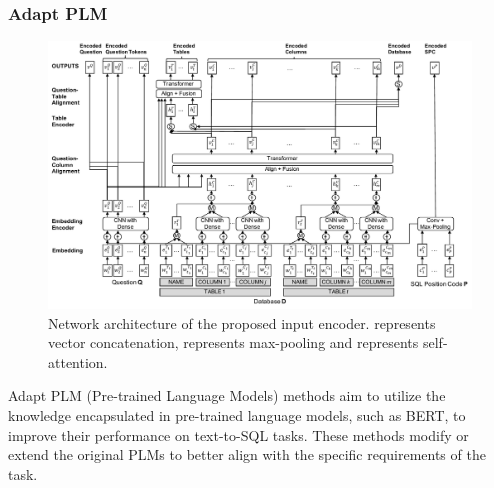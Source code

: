 \subsubsection{Adapt PLM} %
\label{sec:adaptplm}

\begin{figure}[htbp]
    \centering
    \includegraphics[width=\textwidth]{pics/enc/fig_encode}
    \caption{Network architecture of the proposed input encoder.  represents vector concatenation,  represents max-pooling and  represents self-attention.\cite{choi_ryansql_2020}}
    \label{fig:ryan}
\end{figure}

Adapt PLM (Pre-trained Language Models) methods aim to utilize the knowledge encapsulated in pre-trained language models, such as BERT\cite{DBLP:journals/corr/abs-1810-04805}, to improve their performance on text-to-SQL tasks. These methods modify or extend the original PLMs to better align with the specific requirements of the task.

